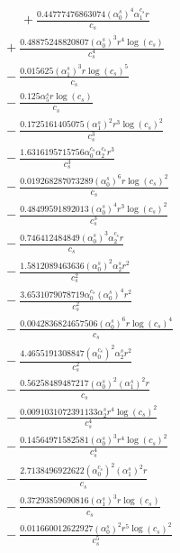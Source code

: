 \documentclass[10pt]{article}
\begin{document}
\begin{align*}
\phantom{R_{0,7}} &\phantom{={}}{}  + \frac{0.44777476863074 \left(\alpha_{0}^s\right)^{4} \alpha_{1}^{c_s} r}{c_{s}} \\
&{}  + \frac{0.48875248820807 \left(\alpha_{0}^s\right)^{3} r^{4} \log{\left(c_{s} \right)}}{c_{s}^{4}} \\
&{}  - \frac{0.015625 \left(\alpha_{1}^s\right)^{3} r \log{\left(c_{s} \right)}^{5}}{c_{s}} \\
&{}  - \frac{0.125 \alpha_{5}^s r \log{\left(c_{s} \right)}}{c_{s}} \\
&{}  - \frac{0.1725161405075 \left(\alpha_{1}^s\right)^{2} r^{3} \log{\left(c_{s} \right)}^{2}}{c_{s}^{3}} \\
&{}  - \frac{1.6316195715756 \alpha_{0}^{c_s} \alpha_{2}^{c_s} r^{3}}{c_{s}^{3}} \\
&{}  - \frac{0.019268287073289 \left(\alpha_{0}^s\right)^{6} r \log{\left(c_{s} \right)}^{2}}{c_{s}} \\
&{}  - \frac{0.48499591892013 \left(\alpha_{0}^s\right)^{4} r^{3} \log{\left(c_{s} \right)}^{2}}{c_{s}^{3}} \\
&{}  - \frac{0.746412484849 \left(\alpha_{0}^s\right)^{3} \alpha_{2}^{c_s} r}{c_{s}} \\
&{}  - \frac{1.5812089463636 \left(\alpha_{0}^s\right)^{2} \alpha_{2}^s r^{2}}{c_{s}^{2}} \\
&{}  - \frac{3.6531079078719 \alpha_{0}^{c_s} \left(\alpha_{0}^s\right)^{4} r^{2}}{c_{s}^{2}} \\
&{}  - \frac{0.0042836824657506 \left(\alpha_{0}^s\right)^{6} r \log{\left(c_{s} \right)}^{4}}{c_{s}} \\
&{}  - \frac{4.4655191308847 \left(\alpha_{0}^{c_s}\right)^{2} \alpha_{2}^s r^{2}}{c_{s}^{2}} \\
&{}  - \frac{0.56258489487217 \left(\alpha_{0}^s\right)^{2} \left(\alpha_{1}^s\right)^{2} r}{c_{s}} \\
&{}  - \frac{0.0091031072391133 \alpha_{2}^s r^{4} \log{\left(c_{s} \right)}^{2}}{c_{s}^{4}} \\
&{}  - \frac{0.14564971582581 \left(\alpha_{0}^s\right)^{3} r^{4} \log{\left(c_{s} \right)}^{2}}{c_{s}^{4}} \\
&{}  - \frac{2.7138496922622 \left(\alpha_{0}^{c_s}\right)^{2} \left(\alpha_{1}^s\right)^{2} r}{c_{s}} \\
&{}  - \frac{0.37293859690816 \left(\alpha_{1}^s\right)^{3} r \log{\left(c_{s} \right)}}{c_{s}} \\
&{}  - \frac{0.011660012622927 \left(\alpha_{0}^s\right)^{2} r^{5} \log{\left(c_{s} \right)}^{2}}{c_{s}^{5}} \\

\end{align*}
\end{document}
